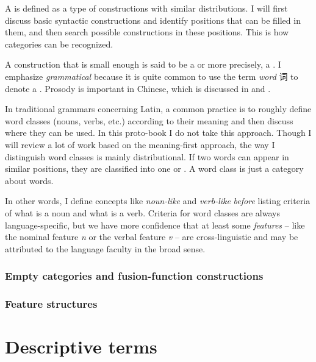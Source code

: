 \documentclass[../main.tex]{subfiles}
\begin{document}
A  is defined as a type of constructions with similar distributions.
I will first discuss basic syntactic constructions and identify positions that can be filled in them, 
and then search possible constructions in these positions. This is how categories can be recognized.

A construction that is small enough is said to be a  or more precisely, 
a .
I emphasize \emph{grammatical} because it is quite common to use the term \emph{word} 词 to denote 
a . Prosody is important in Chinese, which is discussed in 
 and . 

In traditional grammars concerning Latin, a common practice is to roughly define word classes (nouns, verbs, etc.) 
according to their meaning and then discuss where they can be used. 
In this proto-book I do not take this approach. Though I will review a lot of work based on the meaning-first 
approach, the way I distinguish word classes is mainly distributional. If two words can appear in similar
positions, they are classified into one  or .
A word class is just a category about words.  

In other words, I define concepts like \emph{noun-like} and \emph{verb-like} \emph{before} listing criteria of 
what is a noun and what is a verb. Criteria for word classes are always language-specific, but we have more 
confidence that at least some \emph{features} -- like the nominal feature \textit{n} or the verbal feature 
\textit{v} -- are cross-linguistic and may be attributed to the language faculty in the broad sense. 


\subsubsection{Empty categories and fusion-function constructions}

\subsubsection{Feature structures}


\section{Descriptive terms}
\end{document}
